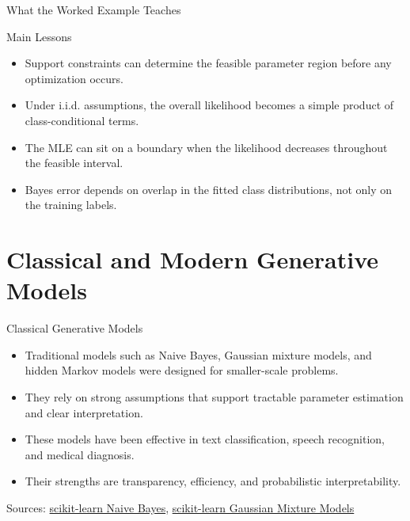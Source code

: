 \documentclass[10pt]{beamer}
\begin{document}
\begin{frame}{What the Worked Example Teaches}
  \justifying
  \begin{examplebox}{Main Lessons}
    \begin{itemize}
      \item Support constraints can determine the feasible parameter region before any optimization occurs.
      \item Under i.i.d. assumptions, the overall likelihood becomes a simple product of class-conditional terms.
      \item The MLE can sit on a boundary when the likelihood decreases throughout the feasible interval.
      \item Bayes error depends on overlap in the fitted class distributions, not only on the training labels.
    \end{itemize}
  \end{examplebox}
\end{frame}

\section{Classical and Modern Generative Models}

\begin{frame}{Classical Generative Models}
  \justifying
  \begin{itemize}
    \item Traditional models such as Naive Bayes, Gaussian mixture models, and hidden Markov models were designed for smaller-scale problems.
    \item They rely on strong assumptions that support tractable parameter estimation and clear interpretation.
    \item These models have been effective in text classification, speech recognition, and medical diagnosis.
    \item Their strengths are transparency, efficiency, and probabilistic interpretability.
  \end{itemize}
  \vspace{0.3em}
  {\footnotesize Sources: \href{https://scikit-learn.org/stable/modules/naive_bayes.html}{scikit-learn Naive Bayes}, \href{https://scikit-learn.org/stable/modules/mixture.html}{scikit-learn Gaussian Mixture Models}}
\end{frame}
\end{document}
